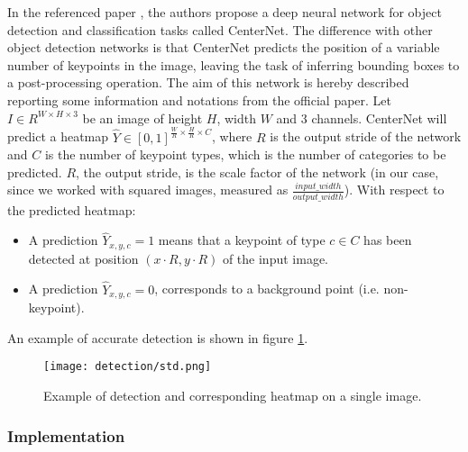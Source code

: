 In the referenced paper \cite{Zhou2019-sd}, the authors propose a deep neural network for object detection and classification tasks called CenterNet. The difference with other object detection networks is that CenterNet predicts the position of a variable number of keypoints in the image, leaving the task of inferring bounding boxes to a post-processing operation. The aim of this network is hereby described reporting some information and notations from the official paper. Let $I \in R^{W \times H \times 3}$ be an image of height $H$, width $W$ and 3 channels. CenterNet will predict a heatmap  $\widehat{Y} \in [0,1]^{\frac{W}{R} \times \frac{H}{R} \times C}$, where $R$ is the output stride of the network and $C$ is the number of keypoint types, which is the number of categories to be predicted. $R$, the output stride, is the scale factor of the network (in our case, since we worked with squared images, measured as $\frac{input\_width}{output\_width}$). With respect to the predicted heatmap:

\begin{itemize}
	\item A prediction $\widehat{Y}_{x,y,c}=1$ means that a keypoint of type $c \in C$ has been detected at position $(x\cdot R, y\cdot R)$ of the input image.
	\item A prediction $\widehat{Y}_{x,y,c}=0$, corresponds to a background point (i.e. non-keypoint).
\end{itemize}

An example of accurate detection is shown in figure \ref{fig:detection-example}.

\begin{figure}
	\centering
	\texttt{[image: detection/std.png]}
	\caption{Example of detection and corresponding heatmap on a single image.}
	\label{fig:detection-example}
\end{figure}

\subsubsection{Implementation}
\label{sssec:implementationdet}

